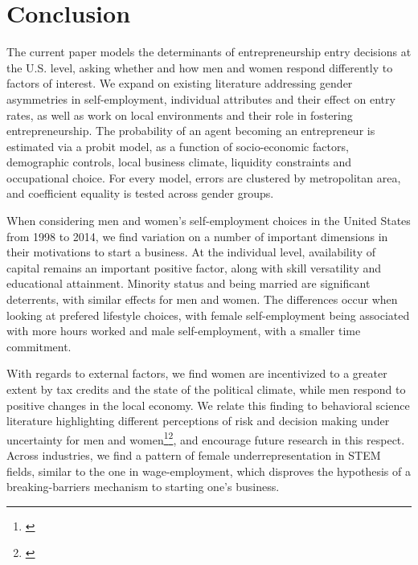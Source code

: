 
\chapter{Conclusion\label{ch:conclusion}}

The current paper models the determinants of entrepreneurship entry decisions at the U.S. level, asking whether and how men and women respond differently to factors of interest. We expand on existing literature addressing gender asymmetries in self-employment, individual attributes and their effect on entry rates, as well as work on local environments and their role in fostering entrepreneurship. The probability of an agent becoming an entrepreneur is estimated via a probit model, as a function of socio-economic factors, demographic controls, local business climate, liquidity constraints and occupational choice. For every model, errors are clustered by metropolitan area, and coefficient equality is tested across gender groups.

When considering men and women's self-employment choices in the United States from 1998 to 2014, we find variation on a number of important dimensions in their motivations to start a business. At the individual level, availability of capital remains an important positive factor, along with skill versatility and educational attainment. Minority status and being married are significant deterrents, with similar effects for men and women. The differences occur when looking at prefered lifestyle choices, with female self-employment being associated with more hours worked and male self-employment, with a smaller time commitment. 

With regards to external factors, we find women are incentivized to a greater extent by tax credits and the state of the political climate, while men respond to positive changes in the local economy. We relate this finding to behavioral science literature highlighting different perceptions of risk and decision making under uncertainty for men and women\footnote{\cite{adams2012beyond}}\hspace{.15em}\footnote{\cite{koellinger2013gender}}, and encourage future research in this respect. Across industries, we find a pattern of female underrepresentation in STEM fields, similar to the one in wage-employment, which disproves the hypothesis of a breaking-barriers mechanism to starting one's business. 

